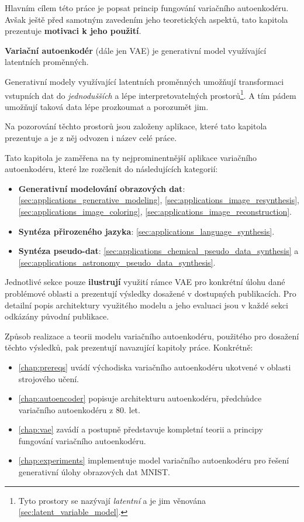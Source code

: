 Hlavním cílem této práce je popsat princip fungování variačního autoenkodéru.
Avšak ještě před samotným zavedením jeho teoretických aspektů, tato kapitola prezentuje \textbf{motivaci k jeho použití}.


\textbf{Variační autoenkodér} (dále jen VAE) je generativní model využívající latentních proměnných.

Generativní modely využívající latentních proměnných umožňují transformaci vstupních dat
do \emph{jednodušších} a lépe interpretovatelných prostorů\footnote{Tyto prostory se nazývají \emph{latentní} a je jim věnována \autoref{sec:latent_variable_model}.}.
A tím pádem umožňují taková data lépe prozkoumat a porozumět jim. \cite{Kingma2019}

Na pozorování těchto prostorů jsou založeny aplikace, které tato kapitola prezentuje a je z něj odvozen i název celé práce.

Tato kapitola je zaměřena na ty nejprominentnější aplikace variačního autoenkodéru, které lze rozčlenit do následujících kategorií:

\begin{itemize}
    \item \textbf{Generativní modelování obrazových dat}: \autoref{sec:applications_generative_modeling}, \autoref{sec:applications_image_resynthesis}, \autoref{sec:applications_image_coloring}, \autoref{sec:applications_image_reconstruction}.
    \item \textbf{Syntéza přirozeného jazyka}: \autoref{sec:applications_language_synthesis}. 
    \item \textbf{Syntéza pseudo-dat}: \autoref{sec:applications_chemical_pseudo_data_synthesis} a \autoref{sec:applications_astronomy_pseudo_data_synthesis}.
\end{itemize}

Jednotlivé sekce pouze \textbf{ilustrují} využití rámce VAE pro konkrétní úlohu dané problémové oblasti a prezentují výsledky dosažené v dostupných publikacích.
Pro detailní popis architektury využitého modelu a jeho evaluaci jsou v každé sekci odkázány původní publikace.

Způsob realizace a teorii modelu variačního autoenkodéru, použitého pro dosažení těchto výsledků, pak prezentují navazující kapitoly práce.
Konkrétně:
\begin{itemize}
    \item \autoref{chap:prereqs} uvádí východiska variačního autoenkodéru ukotvené v oblasti strojového učení.
    \item \autoref{chap:autoencoder} popisuje architekturu autoenkodéru, předchůdce variačního autoenkodéru z 80. let.
    \item \autoref{chap:vae} zavádí a postupně představuje kompletní teorii a principy fungování variačního autoenkodéru.
    \item \autoref{chap:experiments} implementuje model variačního autoenkodéru pro řešení generativní úlohy obrazových dat MNIST.
\end{itemize}